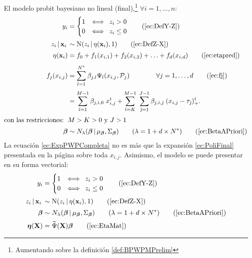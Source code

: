 \documentclass[../Main/Main.tex]{subfiles}
\begin{document}
\begin{definition} \label{def:BPWPMFinal}
El modelo probit bayesiano no lineal (final),\footnote{Aumentando sobre la definición \ref{def:BPWPMPrelim}} $\forall i = 1,\ldots,n$: 
\begin{align}
y_i &= 
	\begin{cases}
		1 & \Longleftrightarrow \enspace z_i > 0 \\
		0 & \Longleftrightarrow \enspace z_i \leq 0
	\end{cases} \tag{\ref{ec:DefY-Z}} \\[2pt]
z_i \,|\, \xni\, &\sim \text{N}(z_i\,|\,\eta(\xni),1) 
	\tag{\ref{ec:DefZ-X}} \\[2pt]
\eta(\xni) &= f_0 + f_1(x_{i,1}) + f_2(x_{i,2}) + \ldots + f_d(x_{i,d})
	\tag{\ref{ec:etapred}} \\[4pt]
f_j(x_{i,j}) &= \sum_{l = 1}^{\N} \beta_{j,l} \Psi_l(x_{i,j}, \mathcal{P}_j) 
	\qquad\qquad
	\forall j = 1,\ldots,d \tag{\ref{ec:fj}} \\[3pt]
&=	\sum_{\hat{\imath} = 1}^{M - 1} \beta_{j,\hat{\imath},0} \; 
		x_{i,j}^{\hat{\imath}} + 
	\sum_{\hat{\imath} = K}^{M-1} \; 	
	\sum_{\hat{\jmath} = 1}^{J-1}\beta_{j,\hat{\imath},\hat{\jmath}}
		\;(x_{i,j} - \t_{\hat{\jmath}})_{+}^{\hat{\imath}}. \label{ec:ExpPWPCompleta}\\[2pt]
	\text{con las restricciones: } \, & M > K > 0 \text{ y } J > 1 \nonumber \\[2pt]
	\bm{\beta} &\sim N_{\lambda}(\bm{\beta}\,|\,\mu_{\bm{\beta}}, \Sigma_{\bm{\beta}}) \qquad(\lambda = 1 + d\times\N) \tag{\ref{ec:BetaAPriori}} 
\end{align}
La ecuación \eqref{ec:ExpPWPCompleta} no es más que la expansión \ref{ec:PoliFinal} presentada en la página \pageref{ec:PoliFinal} sobre toda $x_{i,j}$. Asimismo, el modelo se puede presentar en su forma vectorial:
\begin{align}
y_i &= 
	\begin{cases}
		1 & \Longleftrightarrow \enspace z_i > 0 \\
		0 & \Longleftrightarrow \enspace z_i \leq 0
	\end{cases} \tag{\ref{ec:DefY-Z}} \\[2pt]
z_i \,|\, \xni\, &\sim \text{N}(z_i\,|\,\eta(\xni),1) 
	\tag{\ref{ec:DefZ-X}} \\[2pt]
		\bm{\beta} &\sim N_{\lambda}(\bm{\beta}\,|\,\mu_{\bm{\beta}}, \Sigma_{\bm{\beta}}) \qquad(\lambda = 1 + d\times\N) \tag{\ref{ec:BetaAPriori}} \\[2pt]
\bm{\eta}(\xmat) &= \widetilde{\Psi}(\xmat)\bm{\beta} \tag{\ref{ec:EtaMat}}
\end{align}
\end{definition}
\end{document}
